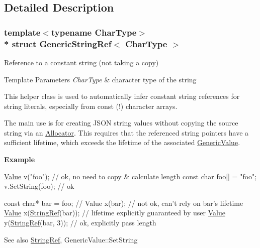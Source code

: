 \subsection{Detailed Description}
\subsubsection*{template$<$typename Char\+Type$>$\\*
struct Generic\+String\+Ref$<$ Char\+Type $>$}

Reference to a constant string (not taking a copy) 


\begin{DoxyTemplParams}{Template Parameters}
{\em Char\+Type} & character type of the string\\
\hline
\end{DoxyTemplParams}
This helper class is used to automatically infer constant string references for string literals, especially from {\ttfamily const} {\bfseries }(!) character arrays.

The main use is for creating J\+S\+ON string values without copying the source string via an \hyperlink{md_Cadriciel_Commun_Externe_RapidJSON_doc_internals_Allocator}{Allocator}. This requires that the referenced string pointers have a sufficient lifetime, which exceeds the lifetime of the associated \hyperlink{class_generic_value}{Generic\+Value}.

{\bfseries Example} 
\begin{DoxyCode}
\hyperlink{class_generic_value}{Value} v(\textcolor{stringliteral}{"foo"});   \textcolor{comment}{// ok, no need to copy & calculate length}
\textcolor{keyword}{const} \textcolor{keywordtype}{char} foo[] = \textcolor{stringliteral}{"foo"};
v.SetString(foo); \textcolor{comment}{// ok}

\textcolor{keyword}{const} \textcolor{keywordtype}{char}* bar = foo;
\textcolor{comment}{// Value x(bar); // not ok, can't rely on bar's lifetime}
\hyperlink{class_generic_value}{Value} x(\hyperlink{struct_generic_string_ref_aa6b9fd9f6aa49405a574c362ba9af6b5}{StringRef}(bar)); \textcolor{comment}{// lifetime explicitly guaranteed by user}
\hyperlink{class_generic_value}{Value} y(\hyperlink{struct_generic_string_ref_aa6b9fd9f6aa49405a574c362ba9af6b5}{StringRef}(bar, 3));  \textcolor{comment}{// ok, explicitly pass length}
\end{DoxyCode}


\begin{DoxySeeAlso}{See also}
\hyperlink{struct_generic_string_ref_aa6b9fd9f6aa49405a574c362ba9af6b5}{String\+Ref}, Generic\+Value\+::\+Set\+String 
\end{DoxySeeAlso}



